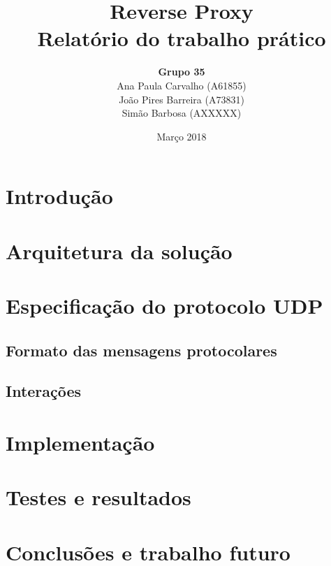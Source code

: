 \documentclass{article}
\title{
       \vspace{60px}
       \Huge \textbf{Reverse Proxy} \\[15px]
       \Large \textbf{Relatório do trabalho prático}
       \vspace{100px}
      }
\author{
        \begin{tabular}{c}
            \textbf{Grupo 35} \\[5px]
                Ana Paula Carvalho (A61855) \\
                João Pires Barreira (A73831) \\
                Simão Barbosa (AXXXXX)
        \end{tabular}
       }
\date{Março 2018}
\begin{document}
\maketitle

\newpage
\section{Introdução}

\section{Arquitetura da solução}

\section{Especificação do protocolo UDP}
\subsection{Formato das mensagens protocolares}
\subsection{Interações}

\section{Implementação}

\section{Testes e resultados}

\section{Conclusões e trabalho futuro}
\end{document}
